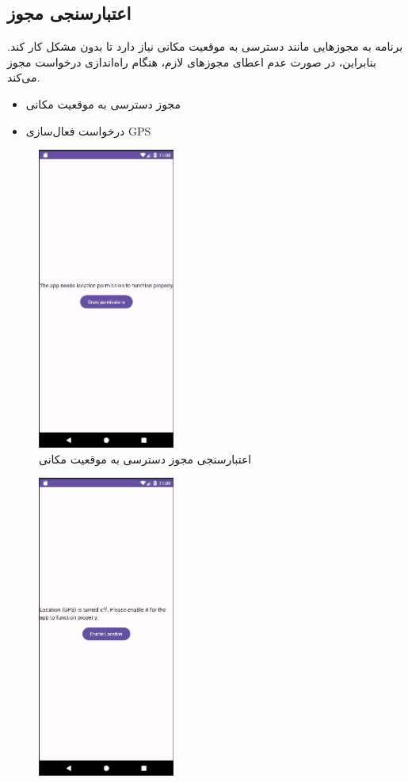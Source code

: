 \documentclass[oneside]{report}
\begin{document}
\subsection{اعتبارسنجی مجوز}
برنامه به مجوزهایی مانند دسترسی به موقعیت مکانی نیاز دارد تا بدون مشکل کار کند. بنابراین، در صورت عدم اعطای مجوزهای لازم، هنگام راه‌اندازی درخواست مجوز می‌کند.
\begin{itemize}
      \item مجوز دسترسی به موقعیت مکانی
      \item درخواست فعال‌سازی GPS
\end{itemize}
\begin{center}
      \begin{figure}[H]
            \centering
            \includegraphics[width=0.4\textwidth]{../images/loc-perm.jpg}
            \caption{اعتبارسنجی مجوز دسترسی به موقعیت مکانی}
      \end{figure}
      \begin{figure}[H]
            \centering
            \includegraphics[width=0.4\textwidth]{../images/gps-enable.jpg}

\end{figure}
\end{center}
\end{document}
